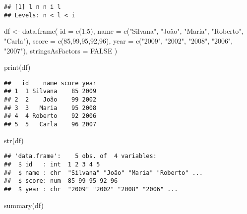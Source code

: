 \documentclass[
]{article}
\newenvironment{Shaded}{\begin{snugshade}}{\end{snugshade}}
\newcommand{\AttributeTok}[1]{\textcolor[rgb]{0.77,0.63,0.00}{#1}}
\newcommand{\ConstantTok}[1]{\textcolor[rgb]{0.00,0.00,0.00}{#1}}
\newcommand{\DecValTok}[1]{\textcolor[rgb]{0.00,0.00,0.81}{#1}}
\newcommand{\FunctionTok}[1]{\textcolor[rgb]{0.00,0.00,0.00}{#1}}
\newcommand{\NormalTok}[1]{#1}
\newcommand{\OtherTok}[1]{\textcolor[rgb]{0.56,0.35,0.01}{#1}}
\newcommand{\SpecialCharTok}[1]{\textcolor[rgb]{0.00,0.00,0.00}{#1}}
\newcommand{\StringTok}[1]{\textcolor[rgb]{0.31,0.60,0.02}{#1}}
\begin{document}
\begin{verbatim}
## [1] l n n i l
## Levels: n < l < i
\end{verbatim}

\begin{Shaded}
\begin{Highlighting}[]
\NormalTok{df }\OtherTok{\textless{}{-}} \FunctionTok{data.frame}\NormalTok{(}
  \AttributeTok{id =} \FunctionTok{c}\NormalTok{(}\DecValTok{1}\SpecialCharTok{:}\DecValTok{5}\NormalTok{),}
  \AttributeTok{name =} \FunctionTok{c}\NormalTok{(}\StringTok{"Silvana"}\NormalTok{, }\StringTok{"João"}\NormalTok{, }\StringTok{"Maria"}\NormalTok{, }\StringTok{"Roberto"}\NormalTok{, }\StringTok{"Carla"}\NormalTok{),}
  \AttributeTok{score =} \FunctionTok{c}\NormalTok{(}\DecValTok{85}\NormalTok{,}\DecValTok{99}\NormalTok{,}\DecValTok{95}\NormalTok{,}\DecValTok{92}\NormalTok{,}\DecValTok{96}\NormalTok{),}
  \AttributeTok{year =} \FunctionTok{c}\NormalTok{(}\StringTok{"2009"}\NormalTok{, }\StringTok{"2002"}\NormalTok{, }\StringTok{"2008"}\NormalTok{, }\StringTok{"2006"}\NormalTok{, }\StringTok{"2007"}\NormalTok{),}
  \AttributeTok{stringsAsFactors =} \ConstantTok{FALSE}
\NormalTok{)}

\FunctionTok{print}\NormalTok{(df)}
\end{Highlighting}
\end{Shaded}

\begin{verbatim}
##   id    name score year
## 1  1 Silvana    85 2009
## 2  2    João    99 2002
## 3  3   Maria    95 2008
## 4  4 Roberto    92 2006
## 5  5   Carla    96 2007
\end{verbatim}

\begin{Shaded}
\begin{Highlighting}[]
\FunctionTok{str}\NormalTok{(df)}
\end{Highlighting}
\end{Shaded}

\begin{verbatim}
## 'data.frame':    5 obs. of  4 variables:
##  $ id   : int  1 2 3 4 5
##  $ name : chr  "Silvana" "João" "Maria" "Roberto" ...
##  $ score: num  85 99 95 92 96
##  $ year : chr  "2009" "2002" "2008" "2006" ...
\end{verbatim}

\begin{Shaded}
\begin{Highlighting}[]
\FunctionTok{summary}\NormalTok{(df)}
\end{Highlighting}
\end{Shaded}
\end{document}

